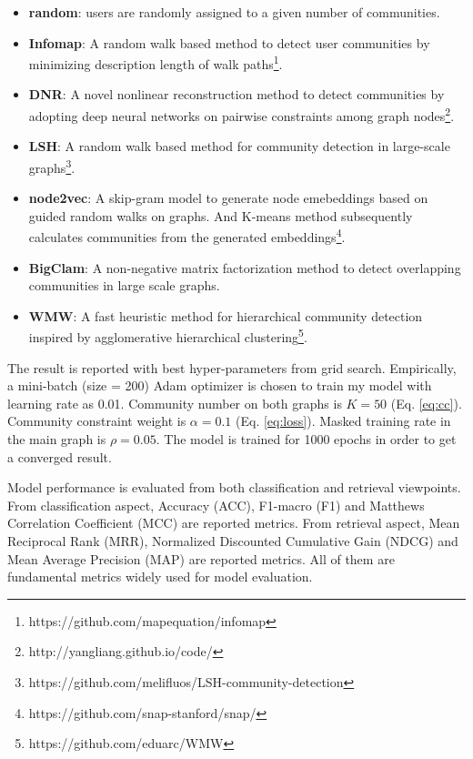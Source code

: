 \begin{itemize}
	\item \textbf{random}: users are randomly assigned to a given number of communities.
	\item \textbf{Infomap}: A random walk based method to detect user communities by minimizing description length of walk paths\footnote{https://github.com/mapequation/infomap}.
	\item \textbf{DNR}: A novel nonlinear reconstruction method to detect communities by adopting deep neural networks on pairwise constraints among graph nodes\footnote{http://yangliang.github.io/code/}.
	\item \textbf{LSH}: A random walk based method for community detection in large-scale graphs\footnote{https://github.com/melifluos/LSH-community-detection}.
	\item \textbf{node2vec}: A skip-gram model to generate node emebeddings based on guided random walks on graphs. And K-means method subsequently calculates communities from the generated embeddings\footnote{https://github.com/snap-stanford/snap/\label{fn:snap}}.
	\item \textbf{BigClam}: A non-negative matrix factorization method to detect overlapping communities in large scale graphs.
	\item \textbf{WMW}: A fast heuristic method for hierarchical community detection inspired by agglomerative hierarchical clustering\footnote{https://github.com/eduarc/WMW}. 
\end{itemize}



The result is reported with best hyper-parameters from grid search. Empirically, a mini-batch (size = 200) Adam optimizer is chosen to train my model with learning rate as 0.01. Community number on both graphs is $K = 50$ (Eq. \ref{eq:cc}). Community constraint weight is $\alpha = 0.1$ (Eq. \ref{eq:loss}). Masked training rate in the main graph is $\rho = 0.05$. The model is trained for 1000 epochs in order to get a converged result. 

Model performance is evaluated from both classification and retrieval viewpoints. From classification aspect, Accuracy (ACC), F1-macro (F1) and Matthews Correlation Coefficient (MCC) are reported metrics.
From retrieval aspect, Mean Reciprocal Rank (MRR), Normalized Discounted Cumulative Gain (NDCG) and Mean Average Precision (MAP) are reported metrics. All of them are fundamental metrics widely used for model evaluation.  